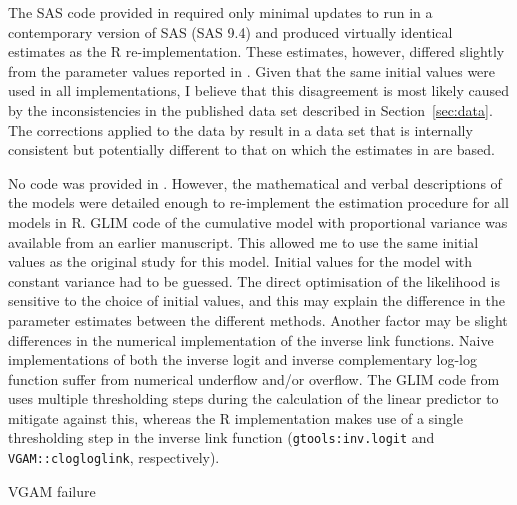 The SAS code provided in \citep{dennis1986stochastic} required only minimal updates to run in a contemporary version of SAS (SAS 9.4) and produced virtually identical estimates as the R re-implementation. These estimates, however, differed slightly from the parameter values reported in \citep{kemp1986stochastic}. Given that the same initial values were used in all implementations, I believe that this disagreement is most likely caused by the inconsistencies in the published data set described in Section~\ref{sec:data}. The corrections applied to the data by \citep{candy1991modeling} result in a data set that is internally consistent but potentially different to that on which the estimates in \citep{kemp1986stochastic} are based.  

No code was provided in \citep{candy1991modeling}. 
However, the mathematical and verbal descriptions of the models were detailed enough to re-implement the estimation procedure for all models in R. 
GLIM code of the cumulative model with proportional variance was available from an earlier manuscript\citep{candy1990biology}. 
This allowed me to use the same initial values as the original study for this model. 
Initial values for the model with constant variance had to be guessed.
The direct optimisation of the likelihood is sensitive to the choice of initial values, and this may explain the difference in the parameter estimates between the different methods. Another factor may be slight differences in the numerical implementation of the inverse link functions. 
Naive implementations of both the inverse logit and inverse complementary log-log function suffer from numerical underflow and/or overflow. 
The GLIM code from \citep{candy1990biology} uses multiple thresholding steps during the calculation of the linear predictor to mitigate against this, whereas the R implementation makes use of a single thresholding step in the inverse link function (\verb+gtools:inv.logit+ and \verb+VGAM::clogloglink+, respectively).  

VGAM failure